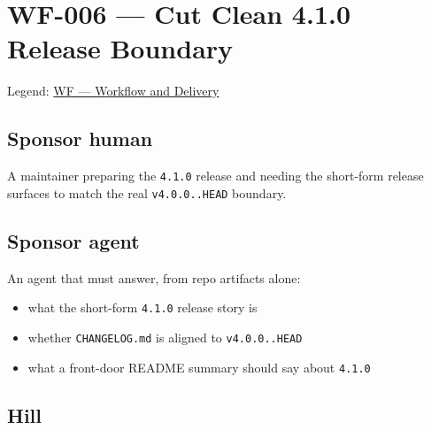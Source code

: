 \chapter{WF-006 --- Cut Clean 4.1.0 Release Boundary}\label{record-204}

\smallskip

Legend: \href{https://github.com/flyingrobots/bijou/blob/1853ad902f6bf219326409e7f743a5a1d6517dbc/docs/legends/WF-workflow-and-delivery.md}{WF --- Workflow and Delivery}

\section{Sponsor human}\label{record-204-sponsor-human}

A maintainer preparing the \texttt{4\allowbreak{}.\allowbreak{}1\allowbreak{}.\allowbreak{}0} release and needing the short-form release surfaces to match the real \texttt{v\allowbreak{}4\allowbreak{}.\allowbreak{}0\allowbreak{}.\allowbreak{}0\allowbreak{}.\allowbreak{}.\allowbreak{}H\allowbreak{}E\allowbreak{}A\allowbreak{}D} boundary.

\section{Sponsor agent}\label{record-204-sponsor-agent}

An agent that must answer, from repo artifacts alone:

\begin{itemize}
\tightlist
\item
  what the short-form \texttt{4\allowbreak{}.\allowbreak{}1\allowbreak{}.\allowbreak{}0} release story is
\item
  whether \texttt{C\allowbreak{}H\allowbreak{}A\allowbreak{}N\allowbreak{}G\allowbreak{}E\allowbreak{}L\allowbreak{}O\allowbreak{}G\allowbreak{}.\allowbreak{}m\allowbreak{}d} is aligned to \texttt{v\allowbreak{}4\allowbreak{}.\allowbreak{}0\allowbreak{}.\allowbreak{}0\allowbreak{}.\allowbreak{}.\allowbreak{}H\allowbreak{}E\allowbreak{}A\allowbreak{}D}
\item
  what a front-door README summary should say about \texttt{4\allowbreak{}.\allowbreak{}1\allowbreak{}.\allowbreak{}0}
\end{itemize}

\section{Hill}\label{record-204-hill}


